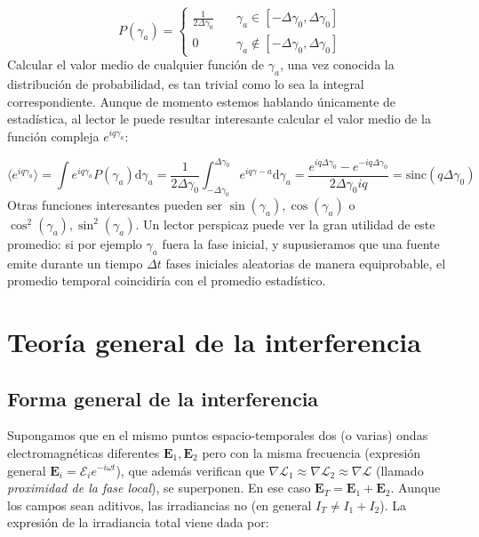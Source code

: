 \documentclass[12pt,a4paper]{book}
\numberwithin{equation}{section}
\numberwithin{figure}{section}
\newcommand{\D}{\mathrm{d}}
\newcommand{\1}{_{(1)}}
\newcommand{\2}{_{(2)}}
\newcommand{\En}{\mathbf{E}}
\newcommand{\Encal}{\boldsymbol{\mathcal{E}}}
\theoremstyle{definition}
\begin{document}
\begin{equation}
P (\gamma_a) = \left\lbrace
\begin{array}{cl}
\frac{1}{2 \Delta \gamma_0} & \quad \gamma_a \in [-\Delta \gamma_0,\Delta \gamma_0] \\
0 & \quad \gamma_a \notin [-\Delta \gamma_0,\Delta \gamma_0]
\end{array}
\right.
\end{equation}
Calcular el valor medio de cualquier función de $\gamma_a$, una vez conocida la distribución de probabilidad, es tan trivial como lo sea la integral correspondiente. Aunque de momento estemos hablando únicamente de estadística, al lector le puede resultar interesante calcular el valor medio de la función compleja $e^{i q \gamma_a}$:

\begin{equation}
\langle e^{i q \gamma_a} \rangle = \int e^{i q \gamma_a}  P(\gamma_a) \D \gamma_a = \frac{1}{2 \Delta \gamma_0} \int_{-\Delta \gamma_0}^{\Delta \gamma_0} e^{i q \gamma-a} \D \gamma_a = \dfrac{e^{i q \Delta \gamma_0} -e^{-i q \Delta \gamma_0} }{2 \Delta \gamma_0 i q } = \mathrm{sinc} (q \Delta \gamma_0)
\end{equation}
Otras funciones interesantes pueden ser $\sin (\gamma_a), \cos (\gamma_a)$ o $\cos^2 ( \gamma_a),\sin^2(\gamma_a)$. Un lector perspicaz puede ver la gran utilidad de este promedio: si por ejemplo $\gamma_a$ fuera la fase inicial, y supusieramos que una fuente emite durante un tiempo $\Delta t$ fases iniciales aleatorias de manera equiprobable, el promedio temporal coincidiría con el promedio estadístico.  

\section{Teoría general de la interferencia}

\subsection{Forma general de la interferencia}

Supongamos que en el mismo puntos espacio-temporales dos (o varias) ondas electromagnéticas diferentes $\En_1,\En_2$ pero con la misma frecuencia (expresión general $\En_i = \Encal_i e^{-i\omega t}$), que además verifican que $\nabla \mathcal{L}_1 \approx \nabla \mathcal{L}_2 \approx \nabla \mathcal{L}$ (llamado \textit{proximidad de la fase local}), se superponen. En ese caso $\En_T = \En_1 + \En_2$. Aunque los campos sean aditivos, las irradiancias no (en general $I_T \neq I_1 + I_2$). La expresión de la irradiancia total viene dada por:
\end{document}
